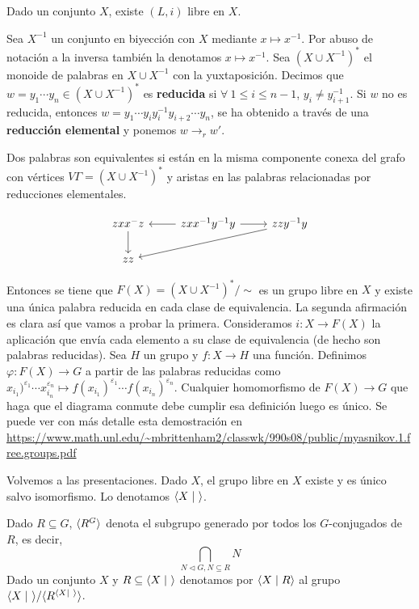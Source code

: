 \documentclass[twoside, 11pt]{article}
\begin{document}
\begin{teorema}
Dado un conjunto $X$, existe $(L,i)$ libre en $X$.
\end{teorema}
\begin{dem}
Sea $X^{-1}$ un conjunto en biyección con $X$ mediante $x\mapsto x^{-1}$. Por abuso de notación a la inversa también la denotamos $x\mapsto x^{-1}$. Sea $(X\cup X^{-1})^*$ el monoide de palabras en $X\cup X^{-1}$ con la yuxtaposición. Decimos que $w=y_1\cdots y_n\in (X\cup X^{-1})^*$ es \textbf{reducida} si $\forall\ 1\leq i\leq n-1$, $y_i\neq y_{i+1}^{-1}$. Si $w$ no es reducida, entonces $w=y_1\cdots y_iy_i^{-1}y_{i+2}\cdots y_n$, se ha obtenido a través de una \textbf{reducción elemental} y ponemos $w\to_r w'$. 

Dos palabras son equivalentes si están en la misma componente conexa del grafo con vértices $V\Gamma=(X\cup X^{-1})^*$ y aristas en las palabras relacionadas por reducciones elementales. 

\[
\begin{tikzcd}
zxx^{-}z\arrow[d] & zxx^{-1}y^{-1}y\arrow[l]\arrow[r] &zzy^{-1}y\arrow[lld]\\
zz 
\end{tikzcd}
\]

Entonces se tiene que $F(X)=(X\cup X^{-1})^*/\sim$ es un grupo libre en $X$ y existe una única palabra reducida en cada clase de equivalencia. La segunda afirmación es clara así que vamos a probar la primera. Consideramos $i:X\to F(X)$ la aplicación que envía cada elemento a su clase de equivalencia (de hecho son palabras reducidas). Sea $H$ un grupo y $f:X\to H$ una función. Definimos $\varphi:F(X)\to G$ a partir de las palabras reducidas como $x_{i_1})^{\varepsilon_1}\cdots x_{i_n}^{\varepsilon_n}\mapsto f(x_{i_1})^{\varepsilon_1}\cdots f(x_{i_n})^{\varepsilon_n}$. Cualquier homomorfismo de $F(X)\to G$ que haga que el diagrama conmute debe cumplir esa definición luego es único. Se puede ver con más detalle esta demostración en \url{https://www.math.unl.edu/~mbrittenham2/classwk/990s08/public/myasnikov.1.free.groups.pdf}

\QED
\end{dem}

Volvemos a las presentaciones. Dado $X$, el grupo libre en $X$ existe y es único salvo isomorfismo. Lo denotamos $\langle{X\mid\ }\rangle$. 

Dado $R\subseteq G$, $\langle{R^G}\rangle$ denota el subgrupo generado por todos los $G$-conjugados de $R$, es decir, $$\bigcap_{N\triangleleft G, N\subseteq R} N$$
Dado un conjunto $X$ y $R\subseteq\langle{X\mid\ }\rangle$ denotamos por $\langle{X\mid R}\rangle$ al grupo $\gene{X\mid\ }/\gene{R^{\gene{X\mid\ }}}$.
\end{document}
